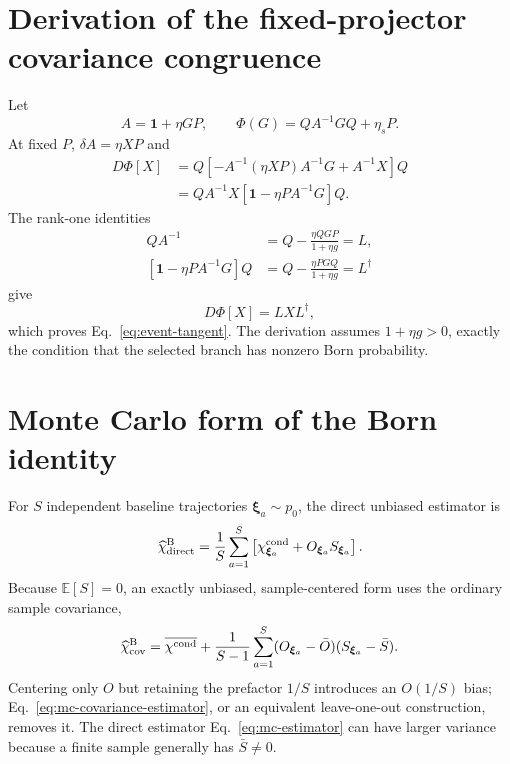 \documentclass[aps,prb,onecolumn,nofootinbib,superscriptaddress]{revtex4-2}
\newcommand{\Id}{\mathbf{1}}
\newcommand{\E}{\mathbb{E}}
\newcommand{\bxi}{\bm{\xi}}
\newcommand{\cond}{\mathrm{cond}}
\newcommand{\Born}{\mathrm{B}}
\begin{document}
\appendix

\section{Derivation of the fixed-projector covariance congruence}
\label{app:derivative}

Let
\begin{equation}
  A=\Id+\eta GP,
  \qquad \Phi(G)=QA^{-1}GQ+\eta_sP.
\end{equation}
At fixed $P$, $\delta A=\eta XP$ and
\begin{align}
  D\Phi[X]
  &=Q\left[-A^{-1}(\eta XP)A^{-1}G+A^{-1}X\right]Q\nonumber\\
  &=QA^{-1}X\left[\Id-\eta PA^{-1}G\right]Q.
  \label{eq:raw-derivative}
\end{align}
The rank-one identities
\begin{align}
  QA^{-1}&=Q-\frac{\eta QGP}{1+\eta g}=L,\nonumber\\
  \left[\Id-\eta PA^{-1}G\right]Q
  &=Q-\frac{\eta PGQ}{1+\eta g}=L^\dagger
\end{align}
give
\begin{equation}
  D\Phi[X]=LXL^\dagger,
\end{equation}
which proves Eq.~\eqref{eq:event-tangent}.  The derivation assumes
$1+\eta g>0$, exactly the condition that the selected branch has nonzero Born
probability.

\section{Monte Carlo form of the Born identity}
\label{app:monte-carlo}

For $S$ independent baseline trajectories $\bxi_a\sim p_0$, the direct
unbiased estimator is
\begin{equation}
  \widehat\chi^{\Born}_{\rm direct}
  =\frac1S\sum_{a=1}^S
  \left[\chi_{\bxi_a}^{\cond}
  +O_{\bxi_a}S_{\bxi_a}\right].
  \label{eq:mc-estimator}
\end{equation}
Because $\E[S]=0$, an exactly unbiased, sample-centered form uses the ordinary
sample covariance,
\begin{equation}
  \widehat\chi^{\Born}_{\rm cov}
  =\overline{\chi^{\cond}}
   +\frac{1}{S-1}\sum_{a=1}^S
    (O_{\bxi_a}-\bar O)(S_{\bxi_a}-\bar S).
  \label{eq:mc-covariance-estimator}
\end{equation}
Centering only $O$ but retaining the prefactor $1/S$ introduces an
$O(1/S)$ bias; Eq.~\eqref{eq:mc-covariance-estimator}, or an equivalent
leave-one-out construction, removes it.  The direct estimator
Eq.~\eqref{eq:mc-estimator} can have larger variance because a finite sample
generally has $\bar S\ne0$.
\end{document}
